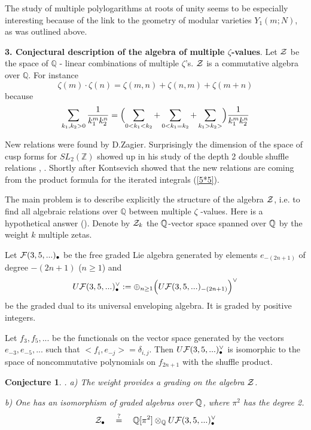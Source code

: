 \documentclass[10pt]{article}
\newtheorem{conjecture}[theorem]{Conjecture}
\begin{document}
The study of multiple polylogarithms at roots of unity seems to be especially interesting 
because of the 
 link to the  geometry 
of modular varieties $Y_1(m;N)$, as was outlined above.  

{\bf 3.  Conjectural description of the algebra of multiple $\zeta$-values}. 
Let  ${\cal Z}$   be the space
of 
  $\mathbb Q$ -  linear combinations of multiple $\zeta$'s. ${\cal Z}$   
is a  commutative algebra 
 over $\mathbb Q$.  For instance 
$$
  \zeta (m)\cdot  \zeta (n) =   \zeta (m,n) +   \zeta(n,m) +  \zeta (m+n)
$$
because
$$
\sum_{k_1,k_2 >0}\frac{1}{k_1^{ m}k_2^{n}} = \Bigl(\sum_{0 < k_1 < k_2 } + \sum_{0 < k_1 = k_2 } + \sum_{ k_1  > k_2 > }\Bigr)\frac{1}{k_1^{ m}k_2^{n}}
$$


 New  relations  were 
found by   
D.Zagier. 
Surprisingly
the dimension of the space of cusp forms for $SL_2(\mathbb Z)$ 
showed up in his study of  the depth 2 double shuffle relations \cite{Z}, \cite{Z1}. 
Shortly after Kontsevich \cite{K1}
showed that the new relations are coming from the product formula for 
 the iterated integrals (\ref{5*5}). 


The main problem  is to describe explicitly the structure of 
the algebra ${\cal Z}$, i.e. to find 
all algebraic relations over $\mathbb Q$ between multiple $\zeta$ -values. 
Here is a hypothetical answer (\cite{G1}). Denote by ${\cal Z}_k$ the ${\mathbb Q}$-vector space 
spanned over ${\mathbb Q}$ by the weight $k$ multiple zetas.  


Let ${\cal F}(3,5,...)_{\bullet}$ be the free graded Lie algebra
generated by elements $e_{-(2n+1)}$ of degree $-(2n+1)$ ($n \geq 1$) and 
$$
U{\cal F}(3,5,...)_{\bullet}^{\vee}:= \oplus_{n \geq 1} 
\Bigl(U{\cal F}(3,5,...)_{-(2n+1)}\Bigr)^{\vee} 
$$ 
be the graded dual to its universal
enveloping algebra. It is graded by positive integers.   

Let $f_3, f_5, ...$ be the functionals on the vector space generated by the vectors $e_{-3}, e_{-5}, ... $ such that $<f_i,e_{-j}> =\delta_{i,j}$.  Then  $U{\cal
F}(3,5,...)_{\bullet}^{\vee}$ is isomorphic to the space of
noncommutative polynomials on $f_{2n+1}$ with the shuffle product.


\begin{conjecture} \label{Conjecture A}. 
a) The  weight provides a grading on the algebra ${\cal
Z}$.   

b) One has an isomorphism of graded algebras over ${\mathbb Q}$, where $\pi^2$ has the degree 2.
$$
{\cal Z}_{\bullet} \quad \stackrel{?}{=} \quad {\mathbb Q}[\pi^2] \otimes_{{\mathbb Q}} U{\cal F}(3,5,...
)_{\bullet}^{\vee} 
$$
\end{conjecture}
\end{document}
